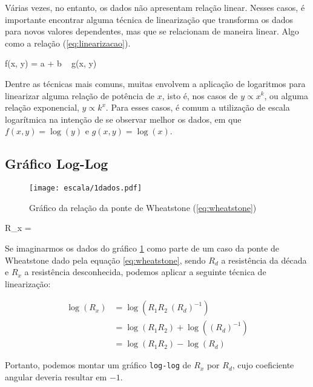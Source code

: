 Várias vezes, no entanto, os dados não apresentam relação linear. Nesses casos, é importante encontrar alguma técnica de linearização que transforma os dados para novos valores dependentes, mas que se relacionam de maneira linear. Algo como a relação (\ref{eq:linearizacao}).

\begin{equacao} \label{eq:linearizacao}
    f(x, y) = a + b ~ g(x, y)
\end{equacao}

Dentre as técnicas mais comuns, muitas envolvem a aplicação de logaritmos para linearizar alguma relação de potência de $x$, isto é, nos casos de $y \propto x^k$, ou alguma relação exponencial, $y \propto k^x$. Para esses casos, é comum a utilização de escala logarítmica na intenção de se observar melhor os dados, em que $f(x, y) = \log(y)$ e $g(x, y) = \log(x)$.


\subsection{Gráfico Log-Log}

    \begin{figure}[htbp]
        \centering
        \texttt{[image: escala/1dados.pdf]}

        \caption{Gráfico da relação da ponte de Wheatstone (\ref{eq:wheatstone})}
        \label{fig:escala:loglog:dados}
    \end{figure}

    \begin{equacao} \label{eq:wheatstone}
        R_x = 
    \end{equacao}

    Se imaginarmos os dados do gráfico \ref{fig:escala:loglog:dados} como parte de um caso da ponte de Wheatstone dado pela equação \ref{eq:wheatstone}, sendo $R_d$ a resistência da década e $R_x$ a resistência desconhecida, podemos aplicar a seguinte técnica de linearização:

    \begin{align*}
        \log(R_x)
            &= \log\left(R_1 R_2 ~ (R_d)^{-1}\right) \\
            &= \log(R_1 R_2) + \log\left((R_d)^{-1}\right) \\
            &= \log(R_1 R_2) - \log(R_d)
    \end{align*}

    Portanto, podemos montar um gráfico \texttt{log-log} de $R_x$ por $R_d$, cujo coeficiente angular deveria resultar em $-1$.

